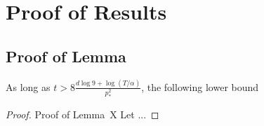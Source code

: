 \documentclass[opre,sglanonrev]{informs4}
\begin{document}
\newpage

\ECSwitch


\section{Proof of Results}

\subsection{Proof of Lemma}

\begin{lemma}
	\label{lem:A1}
    As long as $t>8 \frac{d \log 9 +\log (T/\alpha)}{p_{*}^2}$, the following lower bound
\end{lemma}

\begin{proof}{Proof of Lemma~X}
Let ...
\end{proof}

\end{document}
